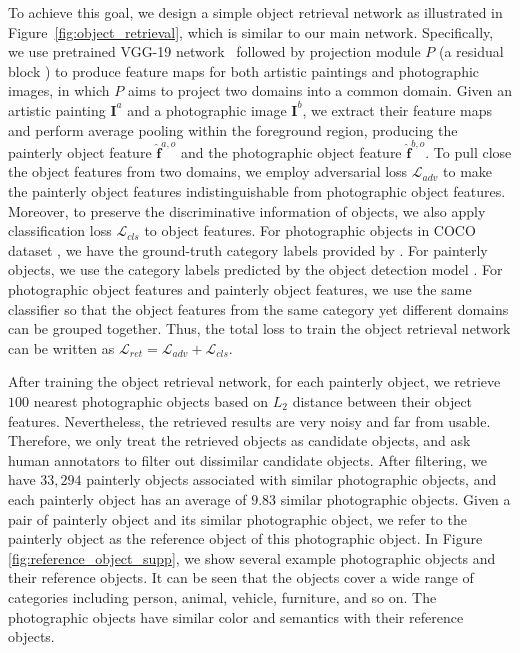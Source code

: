 \documentclass[letterpaper]{article} %
\begin{document}
To achieve this goal, we design a simple object retrieval network as illustrated in Figure~\ref{fig:object_retrieval}, which is similar to our main network. Specifically, we use pretrained VGG-19 network~\cite{VGG19} followed by projection module $P$ (a residual block \cite{he2016deep}) to produce feature maps for both artistic paintings and photographic images, in which $P$ aims to project two domains into a common domain. Given an artistic painting $\bm{I}^a$ and a photographic image $\bm{I}^b$, we extract their feature maps and perform average pooling within the foreground region, producing the painterly object feature $\hat{\bm{f}}^{a,o}$ and the photographic object feature $\hat{\bm{f}}^{b,o}$. To pull close the object features from two domains, we employ adversarial loss $\mathcal{L}_{adv}$ \cite{goodfellow2020generative} to make the painterly object features indistinguishable from photographic object features. Moreover, to preserve the discriminative information of objects, we also apply classification loss $\mathcal{L}_{cls}$ to object features. For photographic objects in COCO dataset \cite{lin2014microsoft}, we have the ground-truth category labels provided by \cite{lin2014microsoft}. For painterly objects, we use the category labels predicted by the object detection model \cite{wu2019detectron2}. For photographic object features and painterly object features, we use the same classifier so that the object features from the same category yet different domains can be grouped together. 
Thus, the total loss to train the object retrieval network can be written as $\mathcal{L}_{ret}=\mathcal{L}_{adv}+\mathcal{L}_{cls}$.

After training the object retrieval network, for each painterly object, we retrieve $100$ nearest photographic objects based on $L_2$ distance between their object features. Nevertheless, the retrieved results are very noisy and far from usable. Therefore, we only treat the retrieved objects as candidate objects, and ask human annotators to filter out dissimilar candidate objects. After filtering, we have $33,294$ painterly objects associated with similar photographic objects, and
each painterly object has an average of $9.83$ similar photographic objects. Given a pair of painterly object and its similar photographic object, we refer to the painterly object as the reference object of this photographic object.
In Figure \ref{fig:reference_object_supp}, we show several example photographic objects and their reference objects. It can be seen that the objects cover a wide range of categories including person, animal, vehicle, furniture, and so on. The photographic objects have similar color and semantics with their reference objects.
\end{document}
